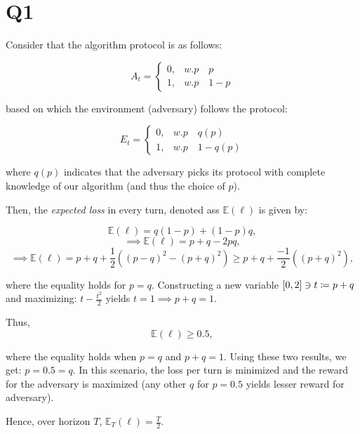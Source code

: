 \section{Q1}
\label{s:Q1}

Consider that the algorithm protocol is as follows:

\[
    A_t = 
\begin{cases}
    0,& w.p \quad p\\
    1,& w.p \quad 1-p
\end{cases}
\]

based on which the environment (adversary) follows the protocol:

\[
    E_t = 
\begin{cases}
    0,& w.p \quad q(p)\\
    1,& w.p \quad 1-q(p)
\end{cases}
\]

where $q(p)$ indicates that the adversary picks its protocol with complete knowledge of our algorithm (and thus the choice of $p$).

Then, the \emph{expected loss} in every turn, denoted ass $\mathbb{E}(\ell)$ is given by:

$$\mathbb{E}(\ell) = q(1-p) + (1-p)q,$$
$$\implies \mathbb{E}(\ell) = p + q - 2pq, $$
$$\implies \mathbb{E}(\ell) = p + q + \frac{1}{2}((p-q)^{2} - (p+q)^{2}) \geq  p + q + \frac{-1}{2}((p+q)^{2}),$$

where the equality holds for $p = q$. Constructing a new variable $[0, 2] \ni t \coloneqq p+q$ and maximizing: $t - \frac{t^2}{2}$ yields $t = 1 \implies p+q = 1$.

Thus, 
$$\mathbb{E}(\ell) \geq 0.5,$$

where the equality holds when $p=q$ and $p+q=1$. Using these two results, we get: $p = 0.5 = q$. In this scenario, the loss per turn is minimized and the reward for the adversary is maximized (any other $q$ for $p=0.5$ yields lesser reward for adversary). 

Hence, over horizon $T$, $\mathbb{E}_{T}(\ell) = \frac{T}{2}$.




